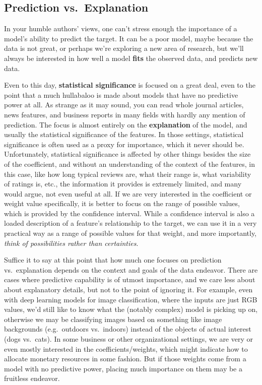 \documentclass[
  letterpaper,
]{krantz}
\begin{document}
\subsection{Prediction
vs.~Explanation}\label{sec-lm-prediction-vs-explanation}

In your humble authors' views, one can't stress enough the importance of
a model's ability to predict the target. It can be a poor model, maybe
because the data is not great, or perhaps we're exploring a new area of
research, but we'll always be interested in how well a model
\textbf{fits} the observed data, and predicts new data.

Even to this day, \textbf{statistical significance} is focused on a
great deal, even to the point that a much hullabaloo is made about
models that have no predictive power at all. As strange as it may sound,
you can read whole journal articles, news features, and business reports
in many fields with hardly any mention of prediction. The focus is
almost entirely on the \textbf{explanation} of the model, and usually
the statistical significance of the features. In those settings,
statistical significance is often used as a proxy for importance, which
it never should be. Unfortunately, statistical significance is affected
by other things besides the size of the coefficient, and without an
understanding of the context of the features, in this case, like how
long typical reviews are, what their range is, what variability of
ratings is, etc., the information it provides is extremely limited, and
many would argue, not even useful at all. If we are very interested in
the coefficient or weight value specifically, it is better to focus on
the range of possible values, which is provided by the confidence
interval. While a confidence interval is also a loaded description of a
feature's relationship to the target, we can use it in a very practical
way as a range of possible values for that weight, and more importantly,
\emph{think of possibilities rather than certainties}.

Suffice it to say at this point that how much one focuses on prediction
vs.~explanation depends on the context and goals of the data endeavor.
There are cases where predictive capability is of utmost importance, and
we care less about about explanatory details, but not to the point of
ignoring it. For example, even with deep learning models for image
classification, where the inputs are just RGB values, we'd still like to
know what the (notably complex) model is picking up on, otherwise we may
be classifying images based on something like image backgrounds
(e.g.~outdoors vs.~indoors) instead of the objects of actual interest
(dogs vs.~cats). In some business or other organizational settings, we
are very or even mostly interested in the coefficients/weights, which
might indicate how to allocate monetary resources in some fashion. But
if those weights come from a model with no predictive power, placing
much importance on them may be a fruitless endeavor.
\end{document}
